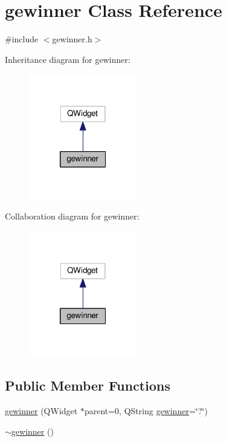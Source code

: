 \hypertarget{classgewinner}{\section{gewinner Class Reference}
\label{classgewinner}
}


{\ttfamily \#include $<$gewinner.\-h$>$}



Inheritance diagram for gewinner\-:\nopagebreak
\begin{figure}[H]
\begin{center}
\leavevmode
\includegraphics[width=134pt]{classgewinner__inherit__graph}
\end{center}
\end{figure}


Collaboration diagram for gewinner\-:\nopagebreak
\begin{figure}[H]
\begin{center}
\leavevmode
\includegraphics[width=134pt]{classgewinner__coll__graph}
\end{center}
\end{figure}
\subsection*{Public Member Functions}
\begin{DoxyCompactItemize}
\item 
\hyperlink{classgewinner_ae06130c27d9adbb780f33e0dc7ef1544}{gewinner} (Q\-Widget $\ast$parent=0, Q\-String \hyperlink{classgewinner}{gewinner}=\char`\"{}?\char`\"{})
\item 
\hyperlink{classgewinner_a99d0fdd7641b64d6e3fcf2d66f743185}{$\sim$gewinner} ()
\end{DoxyCompactItemize}


